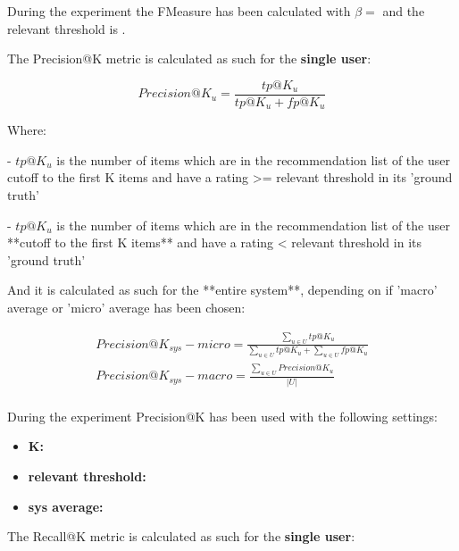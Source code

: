 \hfill\break
During the experiment the FMeasure has been calculated with $\beta = $
 and the relevant threshold is
\textbf{}.


The Precision@K metric is calculated as such for the \textbf{single user}:

    \[
    Precision@K_u = \frac{tp@K_u}{tp@K_u + fp@K_u}
    \]

    Where:

    - $tp@K_u$ is the number of items which are in the recommendation list of the user
      cutoff to the first K items and have a rating >= relevant threshold in its 'ground truth'

    - $tp@K_u$ is the number of items which are in the recommendation list of the user
      **cutoff to the first K items** and have a rating < relevant threshold in its 'ground truth'

\hfill\break

And it is calculated as such for the **entire system**, depending on if 'macro' average or 'micro' average has been
chosen:

   \begin{gather*}
       Precision@K_{sys} - micro = \frac{\sum_{u \in U} tp@K_u}{\sum_{u \in U} tp@K_u + \sum_{u \in U} fp@K_u}\\
       Precision@K_{sys} - macro = \frac{\sum_{u \in U} Precision@K_u}{|U|}\\
   \end{gather*}

\hfill\break

During the experiment Precision@K has been used with the following settings:
\begin{itemize}
    \item \textbf{K:  }
    \item \textbf{relevant threshold: }
    \item \textbf{sys average:  }
\end{itemize}


The Recall@K metric is calculated as such for the \textbf{single user}:

